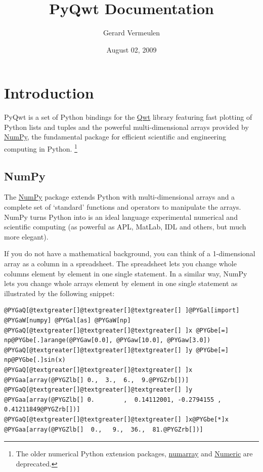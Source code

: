 \documentclass[a4paper,10pt,english]{manual}
\title{PyQwt Documentation}
\date{August 02, 2009}
\author{Gerard Vermeulen}
\begin{document}
\maketitle
\tableofcontents



\resetcurrentobjects
\hypertarget{--doc-introduction}{}

\chapter{Introduction}

PyQwt is a set of Python bindings for the
\href{http://qwt.sourceforge.net}{Qwt}
library featuring fast plotting of Python lists and tuples and the
powerful multi-dimensional arrays provided by
\href{http://numpy.scipy.org}{NumPy}, the fundamental package for
efficient scientific and engineering computing in Python. \footnote{
The older numerical Python extension packages,
\href{http://www.stsci.edu/resources/software\_hardware/numarray}{numarray}
and
\href{http://numpy.scipy.org/}{Numeric}
are deprecated.
}


\section{NumPy}

The \href{http://numpy.scipy.org}{NumPy} package extends Python with
multi-dimensional arrays and a complete set of `standard' functions
and operators to manipulate the arrays. NumPy turns Python into is an
ideal language experimental numerical and scientific computing (as
powerful as APL, MatLab, IDL and others, but much more elegant).

If you do not have a mathematical background, you can think of a
1-dimensional array as a column in a spreadsheet.  The spreadsheet
lets you change whole columns element by element in one single
statement. In a similar way, NumPy lets you change whole arrays
element by element in one single statement as illustrated by the
following snippet:

\begin{Verbatim}[commandchars=@\[\]]
@PYGaQ[@textgreater[]@textgreater[]@textgreater[] ]@PYGal[import] @PYGaW[numpy] @PYGal[as] @PYGaW[np]
@PYGaQ[@textgreater[]@textgreater[]@textgreater[] ]x @PYGbe[=] np@PYGbe[.]arange(@PYGaw[0.0], @PYGaw[10.0], @PYGaw[3.0])
@PYGaQ[@textgreater[]@textgreater[]@textgreater[] ]y @PYGbe[=] np@PYGbe[.]sin(x)
@PYGaQ[@textgreater[]@textgreater[]@textgreater[] ]x
@PYGaa[array(@PYGZlb[] 0.,  3.,  6.,  9.@PYGZrb[])]
@PYGaQ[@textgreater[]@textgreater[]@textgreater[] ]y
@PYGaa[array(@PYGZlb[] 0.        ,  0.14112001, -0.2794155 ,  0.41211849@PYGZrb[])]
@PYGaQ[@textgreater[]@textgreater[]@textgreater[] ]x@PYGbe[*]x
@PYGaa[array(@PYGZlb[]  0.,   9.,  36.,  81.@PYGZrb[])]
\end{Verbatim}
\end{document}
